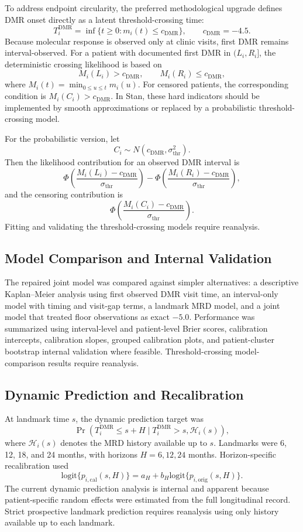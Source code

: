 \documentclass[11pt]{article}
\begin{document}
To address endpoint circularity, the preferred methodological upgrade defines DMR onset directly as a latent threshold-crossing time:
\[
T_i^{\mathrm{DMR}}=\inf\{t\ge 0:m_i(t)\le c_{\mathrm{DMR}}\},
\qquad c_{\mathrm{DMR}}=-4.5.
\]
Because molecular response is observed only at clinic visits, first DMR remains interval-observed. For a patient with documented first DMR in \((L_i,R_i]\), the deterministic crossing likelihood is based on
\[
M_i(L_i)>c_{\mathrm{DMR}}, \qquad M_i(R_i)\le c_{\mathrm{DMR}},
\]
where \(M_i(t)=\min_{0\le u\le t}m_i(u)\). For censored patients, the corresponding condition is \(M_i(C_i)>c_{\mathrm{DMR}}\). In Stan, these hard indicators should be implemented by smooth approximations or replaced by a probabilistic threshold-crossing model.

For the probabilistic version, let
\[
C_i\sim N(c_{\mathrm{DMR}},\sigma_{\mathrm{thr}}^2).
\]
Then the likelihood contribution for an observed DMR interval is
\[
\Phi\left(\frac{M_i(L_i)-c_{\mathrm{DMR}}}{\sigma_{\mathrm{thr}}}\right)
-
\Phi\left(\frac{M_i(R_i)-c_{\mathrm{DMR}}}{\sigma_{\mathrm{thr}}}\right),
\]
and the censoring contribution is
\[
\Phi\left(\frac{M_i(C_i)-c_{\mathrm{DMR}}}{\sigma_{\mathrm{thr}}}\right).
\]
Fitting and validating the threshold-crossing models require reanalysis.

\subsection{Model Comparison and Internal Validation}

The repaired joint model was compared against simpler alternatives: a descriptive Kaplan--Meier analysis using first observed DMR visit time, an interval-only model with timing and visit-gap terms, a landmark MRD model, and a joint model that treated floor observations as exact \(-5.0\). Performance was summarized using interval-level and patient-level Brier scores, calibration intercepts, calibration slopes, grouped calibration plots, and patient-cluster bootstrap internal validation where feasible. Threshold-crossing model-comparison results require reanalysis.

\subsection{Dynamic Prediction and Recalibration}

At landmark time \(s\), the dynamic prediction target was
\[
\Pr(T_i^{\mathrm{DMR}}\le s+H\mid T_i^{\mathrm{DMR}}>s,\mathcal H_i(s)),
\]
where \(\mathcal H_i(s)\) denotes the MRD history available up to \(s\). Landmarks were 6, 12, 18, and 24 months, with horizons \(H=6,12,24\) months. Horizon-specific recalibration used
\[
\mathrm{logit}\{p_{i,\mathrm{cal}}(s,H)\}
=a_H+b_H\mathrm{logit}\{p_{i,\mathrm{orig}}(s,H)\}.
\]
The current dynamic prediction analysis is internal and apparent because patient-specific random effects were estimated from the full longitudinal record. Strict prospective landmark prediction requires reanalysis using only history available up to each landmark.
\end{document}

